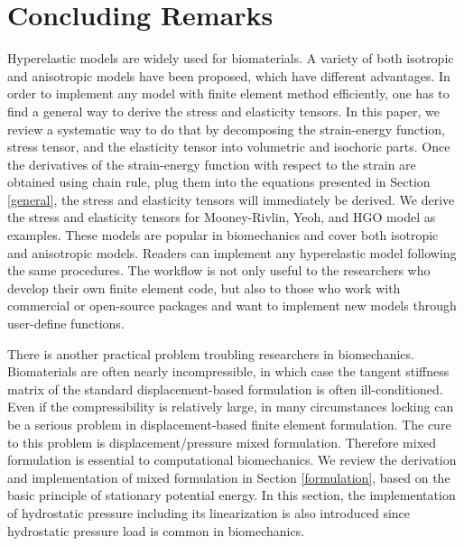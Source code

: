 \section{Concluding Remarks}
\label{conclusions}
Hyperelastic models are widely used for biomaterials. A variety of both isotropic and anisotropic models have been proposed, which have different advantages. In order to implement any model with finite element method efficiently, one has to find a general way to derive the stress and elasticity tensors. In this paper, we review a systematic way to do that by decomposing the strain-energy function, stress tensor, and the elasticity tensor into volumetric and isochoric parts. Once the derivatives of the strain-energy function with respect to the strain are obtained using chain rule, plug them into the equations presented in Section \ref{general}, the stress and elasticity tensors will immediately be derived. We derive the stress and elasticity tensors for Mooney-Rivlin, Yeoh, and HGO model as examples. These models are popular in biomechanics and cover both isotropic and anisotropic models. Readers can implement any hyperelastic model following the same procedures. The workflow is not only useful to the researchers who develop their own finite element code, but also to those who work with commercial or open-source packages and want to implement new models through user-define functions.

There is another practical problem troubling researchers in biomechanics. Biomaterials are often nearly incompressible, in which case the tangent stiffness matrix of the standard displacement-based formulation is often ill-conditioned. Even if the compressibility is relatively large, in many circumstances locking can be a serious problem in displacement-based finite element formulation. The cure to this problem is displacement/pressure mixed formulation. Therefore mixed formulation is essential to computational biomechanics. We review the derivation and implementation of mixed formulation in Section \ref{formulation}, based on the basic principle of stationary potential energy. In this section, the implementation of hydrostatic pressure including its linearization is also introduced since hydrostatic pressure load is common in biomechanics.


